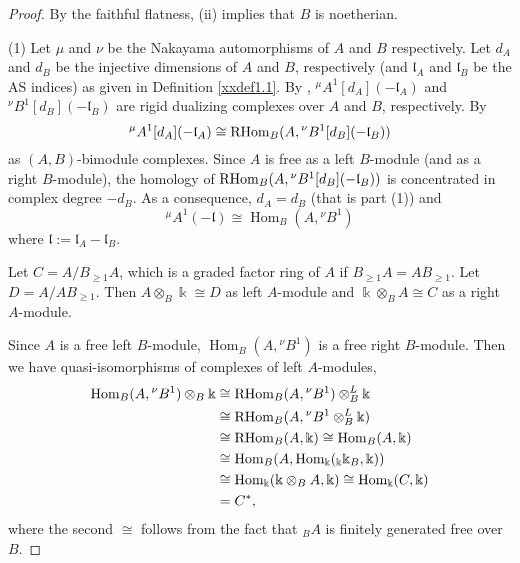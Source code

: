 \begin{proof} 
By the faithful flatness, (ii) implies that $B$ is noetherian.

(1) Let $\mu$ and $\nu$ be the Nakayama automorphisms of $A$ and
$B$ respectively. Let $d_A$ and $d_B$ be the  injective dimensions 
of $A$ and $B$, respectively (and ${\mathfrak l}_A$ and ${\mathfrak l}_B$ be the
AS indices) as given in Definition \ref{xxdef1.1}.
By \cite[Lemma 3.5]{RRZ2},
${^\mu A^1}[d_A](-{\mathfrak l}_A)$ and ${^\nu B^1}[d_B](-{\mathfrak l}_B)$ are 
rigid dualizing complexes over $A$ and $B$, respectively. 
By \cite[Theorem 3.2(i) and Proposition 3.9(i)]{YZ} 
$${^\mu A^1}[d_A](-{\mathfrak l}_A)\cong 
{\rm{RHom}}_B(A, {^\nu B^1}[d_B](-{\mathfrak l}_B))$$
as $(A,B)$-bimodule complexes. Since $A$ is free as a left $B$-module
(and as a right $B$-module),
the homology of ${\rm{RHom}}_B(A, {^\nu B^1}[d_B](-{\mathfrak l}_B))$ is 
concentrated in complex degree $-d_B$. As a consequence,
$d_A=d_B$ (that is part (1)) and
\begin{equation}
\label{E3.4.1}\tag{E3.4.1}
{^\mu A^1}(-{\mathfrak l})\cong \operatorname{Hom}_B(A, {^\nu B^1})
\end{equation}
where ${\mathfrak l}:={\mathfrak l}_A-{\mathfrak l}_B$. 

Let $C=A/B_{\geq 1}A$, which is a graded factor ring of $A$
if $B_{\geq 1}A=AB_{\geq 1}$. Let $D=A/AB_{\geq 1}$.
Then $A\otimes_B \Bbbk\cong D$ as 
left $A$-module and $\Bbbk\otimes_B A\cong C$ as a right $A$-module.

Since $A$ is a free left $B$-module, $\operatorname{Hom}_B(A, {^\nu B^1})$
is a free right $B$-module. Then we have 
quasi-isomorphisms of complexes of left $A$-modules,
$$\begin{aligned}
\operatorname{Hom}_B(A, {^\nu B^1})\otimes_B \Bbbk&\cong 
{\rm{RHom}}_B(A, {^\nu B^1})\otimes^L_B \Bbbk\\
&\cong {\rm{RHom}}_B(A, {^\nu B^1}\otimes^L_B \Bbbk)\\
&\cong {\rm{RHom}}_B(A, \Bbbk)\cong \operatorname{Hom}_B(A,\Bbbk)\\
&\cong \operatorname{Hom}_B(A, \operatorname{Hom}_\Bbbk({_\Bbbk \Bbbk_B},\Bbbk))\\
&\cong \operatorname{Hom}_{\Bbbk}(\Bbbk\otimes_B A, \Bbbk)\cong \operatorname{Hom}_\Bbbk(C,\Bbbk)\\
& = C^*,
\end{aligned}
$$
where the second $\cong$ follows from the fact that $_BA$ is 
finitely generated free over $B$. 


\end{proof}
